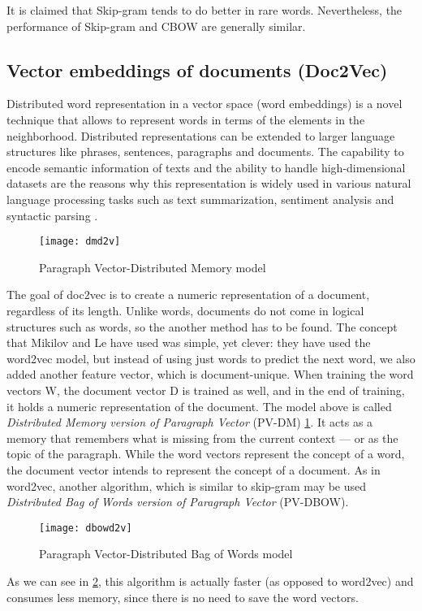 It is claimed that Skip-gram tends to do better in rare words. Nevertheless, the performance of Skip-gram and CBOW are generally similar.

\subsection{Vector embeddings of documents (Doc2Vec)}

Distributed word representation in a vector space (word embeddings) is a novel technique that allows to represent words in terms of the elements in the neighborhood.
Distributed representations can be extended to larger language structures like phrases, sentences, paragraphs and documents. The capability to encode semantic information of texts and the ability to handle high-dimensional datasets are the reasons why this representation is widely used in various natural language processing tasks such as text summarization, sentiment analysis and syntactic parsing \cite{le2014distributed}.

\begin{figure}[ht]
	\centering
	\texttt{[image: dmd2v]}
	\caption[Doc2Vec]{Paragraph Vector-Distributed Memory model}
	\label{fig:pv-dm}
\end{figure}

The goal of doc2vec is to create a numeric representation of a document, regardless of its length.
Unlike words, documents do not come in logical structures such as words, so the another method has to be found.
The concept that Mikilov and Le have used was simple, yet clever: they have used the word2vec model, but instead of using just words to predict the next word, we also added another feature vector, which is document-unique.
When training the word vectors W, the document vector D is trained as well, and in the end of training, it holds a numeric representation of the document.
The model above is called \textit{Distributed Memory version of Paragraph Vector} (PV-DM) \ref{fig:pv-dm}. It acts as a memory that remembers what is missing from the current context — or as the topic of the paragraph. While the word vectors represent the concept of a word, the document vector intends to represent the concept of a document.
As in word2vec, another algorithm, which is similar to skip-gram may be used \textit{Distributed Bag of Words version of Paragraph Vector} (PV-DBOW).

\begin{figure}[ht]
	\centering
	\texttt{[image: dbowd2v]}
	\caption[Doc2Vec]{Paragraph Vector-Distributed Bag of Words model}
	\label{fig:pv-dbow}
\end{figure}

As we can see in \ref{fig:pv-dbow}, this algorithm is actually faster (as opposed to word2vec) and consumes less memory, since there is no need to save the word vectors.